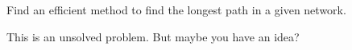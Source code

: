 

Find an efficient method to find the longest path in a given network. 

\solution 
This is an unsolved problem. But maybe you have an idea?

\solutionend